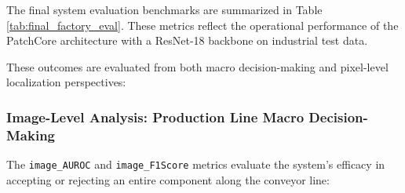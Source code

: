 \documentclass{article}
\begin{document}
The final system evaluation benchmarks are summarized in Table \ref{tab:final_factory_eval}. These metrics reflect the operational performance of the PatchCore architecture with a ResNet-18 backbone on industrial test data.

\begin{table}[htbp]
	\centering
	\caption{Final Factory Evaluation Summary by Class}
	\label{tab:final_factory_eval}
	\vspace{2mm}
\end{table}

These outcomes are evaluated from both macro decision-making and pixel-level localization perspectives:


\subsubsection{Image-Level Analysis: Production Line Macro Decision-Making}

The \texttt{image\_AUROC} and \texttt{image\_F1Score} metrics evaluate the system's efficacy in accepting or rejecting an entire component along the conveyor line:
\end{document}
